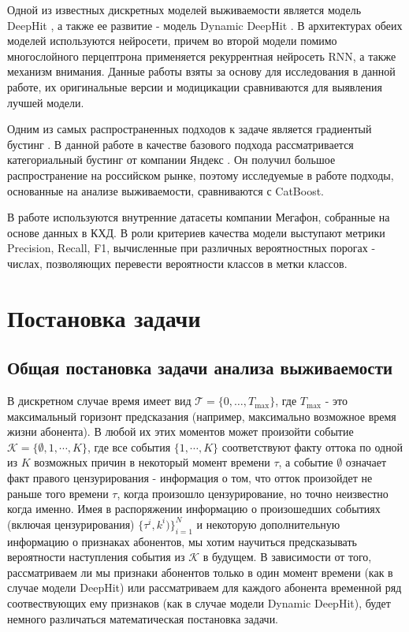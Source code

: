 \documentclass{article}
\begin{document}
Одной из известных дискретных моделей выживаемости является модель DeepHit \cite{Lee2018}, а также ее развитие - модель Dynamic DeepHit \cite{Lee2020}. В архитектурах обеих моделей используются нейросети, причем во второй модели помимо многослойного перцептрона применяется рекуррентная нейросеть RNN, а также механизм внимания. Данные работы взяты за основу для исследования в данной работе, их оригинальные версии и модицикации сравниваются для выявления лучшей модели.

Одним из самых распространенных подходов к задаче является градиентый бустинг \cite{Ahmad2019}.  В данной работе в качестве базового подхода рассматривается категориальный бустинг от компании Яндекс \cite{Dorogush2018}. Он получил большое распространение на российском рынке, поэтому исследуемые в работе подходы, основанные на анализе выживаемости, сравниваются с CatBoost.

В работе используются внутренние датасеты компании Мегафон, собранные на основе данных в КХД. В роли критериев качества модели выступают метрики Precision, Recall, F1, вычисленные при различных вероятностных порогах - числах, позволяющих перевести вероятности классов в метки классов.
\section{Постановка задачи}

\subsection{Общая постановка задачи анализа выживаемости}

В дискретном случае время имеет вид $\mathcal{T}=\{0,\ldots,T_{\max}\}$, где $T_{\max}$ - это максимальный горизонт предсказания (например, максимально возможное время жизни абонента). В любой их этих моментов может произойти событие $\mathcal{K}=\{\emptyset,1,\cdots,K\}$, где все события $\{1,\cdots,K\}$ соответствуют факту оттока по одной из $K$ возможных причин в некоторый момент времени $\tau$, а событие $\emptyset$ означает факт правого цензурирования - информация о том, что отток произойдет не раньше того времени $\tau$, когда произошло цензурирование, но точно неизвестно когда именно. Имея в распоряжении информацию о произошедших событиях (включая цензурирования) $\{\tau^{i},k^{i})\}_{i=1}^{N}$ и некоторую дополнительную информацию о признаках абонентов, мы хотим научиться предсказывать вероятности наступления события из $\mathcal{K}$ в будущем. В зависимости от того, рассматриваем ли мы признаки абонентов только в один момент времени (как в случае модели DeepHit) или рассматриваем для каждого абонента временной ряд соотвествующих ему признаков (как в случае модели Dynamic DeepHit), будет немного различаться математическая постановка задачи. 
\end{document}
